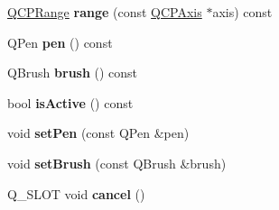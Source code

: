 \begin{DoxyCompactItemize}
\mbox{\label{class_q_c_p_selection_rect_a23ab082ffa04be1dbf9afb9e633ab815}} 
\hyperlink{class_q_c_p_range}{Q\+C\+P\+Range} {\bfseries range} (const \hyperlink{class_q_c_p_axis}{Q\+C\+P\+Axis} $\ast$axis) const
\item 
\mbox{\label{class_q_c_p_selection_rect_ab4229f8faeaffba9617d2e6c4779b765}} 
Q\+Pen {\bfseries pen} () const
\item 
\mbox{\label{class_q_c_p_selection_rect_a9669c77c5796dea9dc089a088d50ebfb}} 
Q\+Brush {\bfseries brush} () const
\item 
\mbox{\label{class_q_c_p_selection_rect_ad27c1569c6ea8fa48e24b81e2a302df3}} 
bool {\bfseries is\+Active} () const
\item 
\mbox{\label{class_q_c_p_selection_rect_ada20b7fb1b2dcbe50523262636b06963}} 
void {\bfseries set\+Pen} (const Q\+Pen \&pen)
\item 
\mbox{\label{class_q_c_p_selection_rect_ab0c66f1484418782efa01f4153611080}} 
void {\bfseries set\+Brush} (const Q\+Brush \&brush)
\item 
\mbox{\label{class_q_c_p_selection_rect_aecab056215dc9426049ea5adc784edec}} 
Q\+\_\+\+S\+L\+OT void {\bfseries cancel} ()
\end{DoxyCompactItemize}

